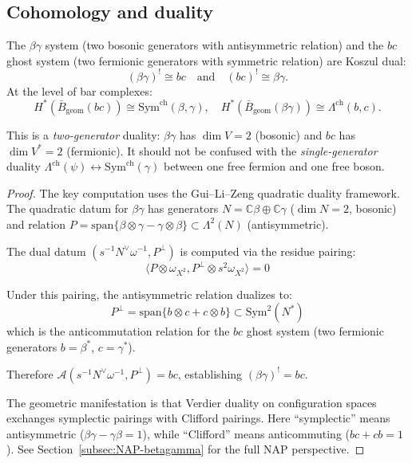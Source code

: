 \subsection{Cohomology and duality}\label{sec:fermion-boson-koszul}

\begin{theorem}\label{thm:betagamma-bc-koszul}
The $\beta\gamma$ system (two bosonic generators with antisymmetric relation) and the $bc$ ghost system (two fermionic generators with symmetric relation) are Koszul dual:
\begin{equation}\label{eq:betagamma-bc-koszul}
(\beta\gamma)^! \cong bc \quad \text{and} \quad (bc)^! \cong \beta\gamma.
\end{equation}
At the level of bar complexes:
\[
H^*(\bar{B}_{\mathrm{geom}}(bc)) \cong \mathrm{Sym}^{\mathrm{ch}}(\beta, \gamma), \quad
H^*(\bar{B}_{\mathrm{geom}}(\beta\gamma)) \cong \Lambda^{\mathrm{ch}}(b, c).
\]
\end{theorem}

\begin{remark}
This is a \emph{two-generator} duality: $\beta\gamma$ has $\dim V = 2$ (bosonic) and $bc$ has $\dim V^* = 2$ (fermionic). It should not be confused with the \emph{single-generator} duality $\Lambda^{\mathrm{ch}}(\psi) \leftrightarrow \mathrm{Sym}^{\mathrm{ch}}(\gamma)$ between one free fermion and one free boson.
\end{remark}

\begin{proof}
The key computation uses the Gui--Li--Zeng quadratic duality framework.  The quadratic datum for $\beta\gamma$ has generators $N = \mathbb{C}\beta \oplus \mathbb{C}\gamma$ ($\dim N = 2$, bosonic) and relation $P = \mathrm{span}\{\beta \otimes \gamma - \gamma \otimes \beta\} \subset \Lambda^2(N)$ (antisymmetric).

The dual datum $(s^{-1}N^\vee\omega^{-1}, P^\perp)$ is computed via the residue pairing:
\[\langle P \otimes \omega_{X^2}, P^\perp \otimes s^2\omega_{X^2}\rangle = 0\]

Under this pairing, the antisymmetric relation dualizes to:
\[P^\perp = \mathrm{span}\{b \otimes c + c \otimes b\} \subset \mathrm{Sym}^2(N^*)\]
which is the anticommutation relation for the $bc$ ghost system (two fermionic generators $b = \beta^*$, $c = \gamma^*$).

Therefore $\mathcal{A}(s^{-1}N^\vee\omega^{-1}, P^\perp) = bc$, establishing $(\beta\gamma)^! = bc$.

The geometric manifestation is that Verdier duality on configuration spaces
exchanges symplectic pairings with Clifford pairings. Here ``symplectic''
means antisymmetric ($\beta\gamma - \gamma\beta = 1$), while ``Clifford'' means anticommuting ($bc + cb = 1$).
See Section~\ref{subsec:NAP-betagamma} for the full NAP perspective.
\end{proof}
 

